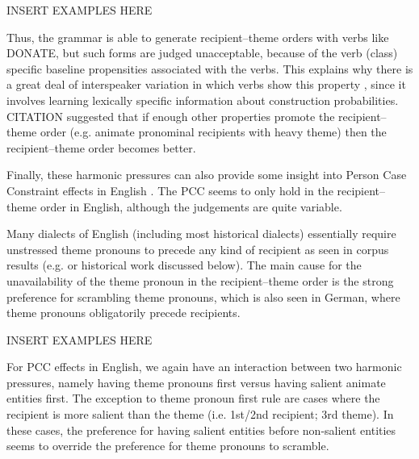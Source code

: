 \documentclass[11pt]{upenndiss}
\begin{document}
INSERT EXAMPLES HERE

Thus, the grammar is able to generate recipient--theme orders with verbs like DONATE, but such forms are judged unacceptable, because of the verb (class) specific baseline propensities associated with the verbs. This explains why there is a great deal of interspeaker variation in which verbs show this property \citep{Levin.1993}, since it involves learning lexically specific information about construction probabilities. CITATION suggested that if enough other properties promote the recipient--theme order (e.g. animate pronominal recipients with heavy theme) then the recipient--theme order becomes better.

\begin{exe}
	\ex 
	\begin{xlist}
	\end{xlist}
\end{exe}

Finally, these harmonic pressures can also provide some insight into Person Case Constraint effects in English \citep{Haspelmath.2004}. The PCC seems to only hold in the recipient--theme order in English, although the judgements are quite variable.

\begin{exe}
\ex \cite[ex 29]{Haspelmath.2004}
\begin{xlist}
\end{xlist}
\ex 
\begin{xlist}
\end{xlist}
\end{exe}

Many dialects of English (including most historical dialects) essentially require unstressed theme pronouns to precede any kind of recipient as seen in corpus results (e.g. \cite{Bresnan.2007} or historical work discussed below). The main cause for the unavailability of the theme pronoun in the recipient--theme order is the strong preference for scrambling theme pronouns, which is also seen in German, where theme pronouns obligatorily precede recipients. 

INSERT EXAMPLES HERE

For PCC effects in English, we again have an interaction between two harmonic pressures, namely having theme pronouns first versus having salient animate entities first. The exception to theme pronoun first rule are cases where the recipient is more salient than the theme (i.e. 1st/2nd recipient; 3rd theme). In these cases, the preference for having salient entities before non-salient entities seems to override the preference for theme pronouns to scramble.
\end{document}
